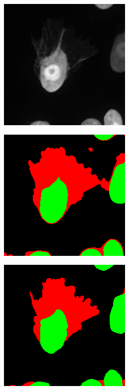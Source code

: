 \begin {figure}[!htb]
\begin {subfigure}[b]{0.25\linewidth}
	\end {subfigure}
	\par\medskip
	\begin {subfigure}[b]{0.25\linewidth}
		\includegraphics[scale=0.45]{img/fig_quali_tile4.png}
	\end {subfigure}\hspace{0.5cm}
	\begin {subfigure}[b]{0.25\linewidth}
		\includegraphics[scale=0.45]{img/fig_quali_tile4_pred_c3.png}
	\end {subfigure}\hspace{0.5cm}
	\begin {subfigure}[b]{0.25\linewidth}
		\includegraphics[scale=0.45]{img/fig_quali_tile4_pred_c3_GT.png}

\end{subfigure}
\end{figure}
